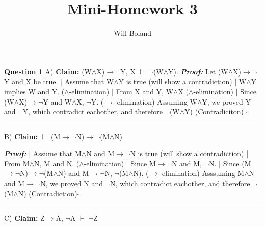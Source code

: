 \documentclass{article}
\begin{document}
\title{Mini-Homework 3}
\author{Will Boland}
\maketitle

\textbf{Question 1}\newline
A) \textbf{Claim: } (W$\wedge$X)$\rightarrow$$\neg$Y, X $\vdash$ $\neg$(W$\wedge$Y). \newline\newline
\textbf{\textit{Proof: }}\newline
Let (W$\wedge$X)$\rightarrow$$\neg$Y and X be true.\newline
|	Assume that W$\wedge$Y is true (will show a contradiction)\newline
|	W$\wedge$Y implies W and Y. ($\wedge$-elimination)\newline
|	From X and Y, W$\wedge$X ($\wedge$-elimination)\newline
|	Since (W$\wedge$X)$\rightarrow$$\neg$Y and W$\wedge$X, $\neg$Y. ($\rightarrow$-elimination)\newline
Assuming W$\wedge$Y, we proved Y and $\neg$Y, which contradict eachother, and therefore $\neg$(W$\wedge$Y) (Contradiciton) $\square$\newline\rule{10cm}{1pt}\newline



B) \textbf{Claim: } $\vdash$ (M$\rightarrow$$\neg$N)$\rightarrow$$\neg$(M$\wedge$N)\newline

\textbf{\textit{Proof: }}\newline
|	Assume that M$\wedge$N and M$\rightarrow$$\neg$N is true (will show a contradiction)\newline
|	From M$\wedge$N, M and N. ($\wedge$-elimination)\newline
|	Since M$\rightarrow$$\neg$N and M, $\neg$N.
|	Since (M$\rightarrow$$\neg$N)$\rightarrow$$\neg$(M$\wedge$N) and M$\rightarrow$$\neg$N, $\neg$(M$\wedge$N). ($\rightarrow$-elimination)\newline
Asssuming  M$\wedge$N and M$\rightarrow$$\neg$N, we proved N and $\neg$N, which contradict eachother, and therefore $\neg$(M$\wedge$N) (Contradiction)$\square$\newline\rule{10cm}{1pt}\newline



C) \textbf{Claim: } Z$\rightarrow$A, $\neg$A $\vdash$ $\neg$Z\newline
\end{document}
